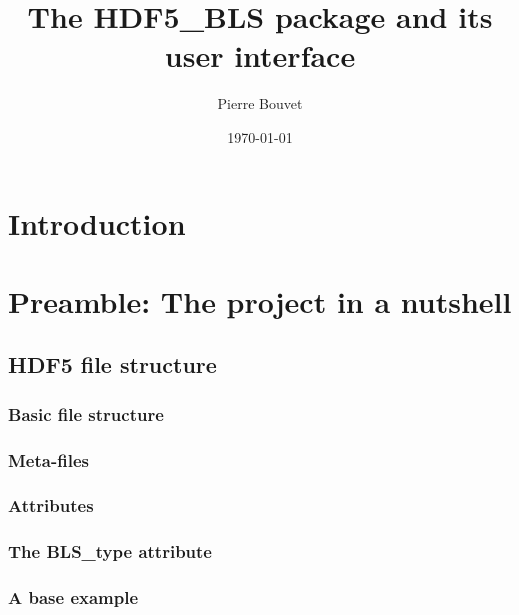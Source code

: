 \documentclass{book}
\title{The HDF5\_BLS package and its user interface}
\author{Pierre Bouvet}
\date{\today}
\begin{document}
\maketitle

\tableofcontents

\chapter*{Introduction}
    

    
\chapter*{Preamble: The project in a nutshell}
    \section*{HDF5 file structure}
        \subsection*{Basic file structure}
            
        
        \subsection*{Meta-files}
            
        
        \subsection*{Attributes}
            
        
        \subsection*{The BLS\_type attribute}\label{subsec:preamble.file_structure.complete_structure}
            
        
        \subsection*{A base example}\label{subsec:preamble.file_structure.some_examples}
            
\end{document}
